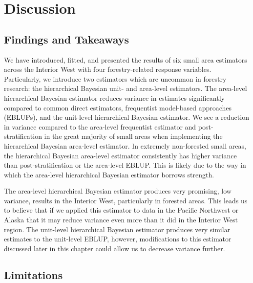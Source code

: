 \documentclass[12pt,twoside]{reedthesis}
\begin{document}
\hypertarget{discussion}{%
\chapter{Discussion}\label{discussion}}

\hypertarget{findings-and-takeaways}{%
\section{Findings and Takeaways}\label{findings-and-takeaways}}

We have introduced, fitted, and presented the results of six small area estimators across the Interior West with four forestry-related response variables. Particularly, we introduce two estimators which are uncommon in forestry research: the hierarchical Bayesian unit- and area-level estimators. The area-level hierarchical Bayesian estimator reduces variance in estimates significantly compared to common direct estimators, frequentist model-based approaches (EBLUPs), and the unit-level hierarchical Bayesian estimator. We see a reduction in variance compared to the area-level frequentist estimator and post-stratification in the great majority of small areas when implementing the hierarchical Bayesian area-level estimator. In extremely non-forested small areas, the hierarchical Bayesian area-level estimator consistently has higher variance than post-stratification or the area-level EBLUP. This is likely due to the way in which the area-level hierarchical Bayesian estimator borrows strength.

The area-level hierarchical Bayesian estimator produces very promising, low variance, results in the Interior West, particularly in forested areas. This leads us to believe that if we applied this estimator to data in the Pacific Northwest or Alaska that it may reduce variance even more than it did in the Interior West region. The unit-level hierarchical Bayesian estimator produces very similar estimates to the unit-level EBLUP, however, modifications to this estimator discussed later in this chapter could allow us to decrease variance further.

\hypertarget{limitations}{%
\section{Limitations}\label{limitations}}
\end{document}
